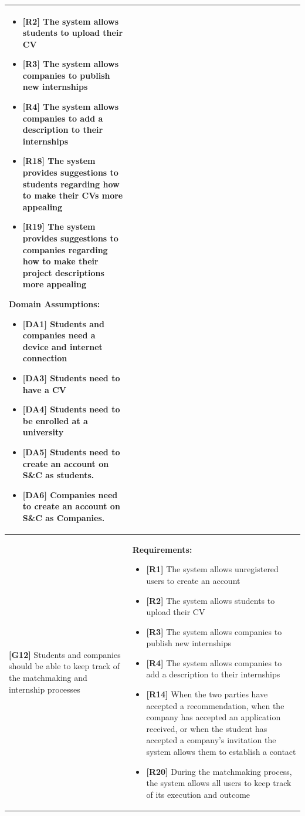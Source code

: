 \begin{longtable}{|p{}|p{}|}
\begin{itemize}
    \item \textbf{[R2]} The system allows students to upload their CV
    \item \textbf{[R3]} The system allows companies to publish new internships
    \item \textbf{[R4]} The system allows companies to add a description to their internships
    \item \textbf{[R18]} The system provides suggestions to students regarding how to make their CVs more appealing
    \item \textbf{[R19]} The system provides suggestions to companies regarding how to make their project descriptions more appealing
\end{itemize}
\textbf{Domain Assumptions:}
\begin{itemize}
    \item \textbf{[DA1]} Students and companies need a device and internet connection
     \item \textbf{[DA3]} Students need to have a CV
     \item \textbf{[DA4]} Students need to be enrolled at a university
    \item \textbf{[DA5]} Students need to create an account on S\&C as students.
    \item \textbf{[DA6]} Companies need to create an account on S\&C as Companies.
\end{itemize} \\
\hline
\textbf{[G12]} Students and companies should be able to keep track of the matchmaking and internship processes
& 
\textbf{Requirements:}
\begin{itemize}
    \item \textbf{[R1]} The system allows unregistered users to create an account
    \item \textbf{[R2]} The system allows students to upload their CV
    \item \textbf{[R3]} The system allows companies to publish new internships
    \item \textbf{[R4]} The system allows companies to add a description to their internships
    \item \textbf{[R14]} When the two parties have accepted a recommendation, when the company has accepted an application received, or when the student has accepted a company's invitation the system allows them to establish a contact
    \item \textbf{[R20]} During the matchmaking process, the system allows all users to keep track of its execution and outcome

\end{itemize}
\end{longtable}
